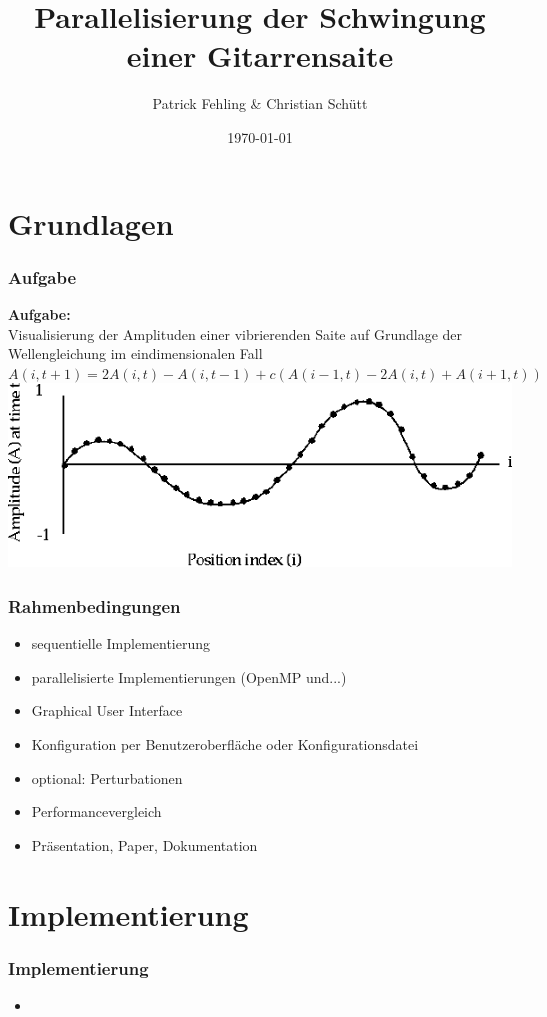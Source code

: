 \documentclass[xcolor=dvipsnames]{beamer}
\title{Parallelisierung der Schwingung einer Gitarrensaite}
\author{Patrick Fehling \& Christian Schütt}
\date{\today}
\begin{document}
\maketitle
\frame{\tableofcontents}

\section{Grundlagen}
\begin{frame}\frametitle{Aufgabe}
		\textbf{Aufgabe:}\\
		Visualisierung der Amplituden einer vibrierenden Saite auf Grundlage der Wellengleichung im eindimensionalen Fall\\
		\vspace{1ex}
		$A(i, t + 1) = 2A(i, t) - A(i, t - 1) + c(A(i - 1, t) - 2A(i, t) + A(i + 1, t))$\\
		\vspace{2ex}
		\includegraphics[width=1.0\textwidth,valign=t]{pictures/wellengleichung_aufgabe}
\end{frame}

\begin{frame}\frametitle{Rahmenbedingungen}
	\begin{itemize}
		\item sequentielle Implementierung
		\item parallelisierte Implementierungen (OpenMP und...)
		\item Graphical User Interface
		\item Konfiguration per Benutzeroberfläche oder Konfigurationsdatei
		\item optional: Perturbationen
		\vspace{3ex}
		\item Performancevergleich
		\item Präsentation, Paper, Dokumentation
	\end{itemize}
\end{frame}

\section{Implementierung}
\begin{frame}\frametitle{Implementierung}
	\begin{itemize}
		\item
	\end{itemize}
\end{frame}
\end{document}
